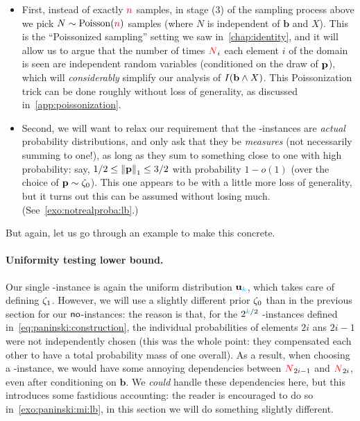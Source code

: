 \begin{itemize}
	\item First, instead of exactly ${\textcolor{purple}{n}}$ samples, in stage (3) of the sampling process above we pick $N\sim\poisson{\ns}$ samples (where $N$ is independent of $\mathbf{b}$ and $X$). This is the ``Poissonized sampling'' setting we saw in~\cref{chap:identity}, and it will allow us to argue that the number of times $\textcolor{red}{N}_{i}$ each element $i$ of the domain is seen are independent random variables (conditioned on the draw of $\mathbf{p}$), which will \emph{considerably} simplify our analysis of $\mutualinfo{\mathbf{b}}{X}$. This Poissonization trick can be done roughly without loss of generality, as discussed in~\cref{app:poissonization}.
	\item Second, we will want to relax our requirement that the \no-instances are \emph{actual} probability distributions, and only ask that they be \emph{measures} (not necessarily summing to one!), as long as they sum to something close to one with high probability: say, $1/2\leq \normone{\p} \leq 3/2$ with probability $1-o(1)$ (over the choice of $\mathbf{p}\sim\zeta_0$). This one appears to be with a little more loss of generality, but it turns out this can be assumed without losing much. (See~\cref{exo:notrealproba:lb}.) 
\end{itemize}
\noindent But again, let us go through an example to make this concrete.

\paragraph{Uniformity testing lower bound.} Our single \yes-instance is again the uniform distribution $\mathbf{u}_{\textcolor{cyan}{k}}$, which takes care of defining $\zeta_1$. However, we will use a slightly different prior $\zeta_0$ than in the previous section for our ${\sf{}no}$-instances: the reason is that, for the $2^{{\textcolor{cyan}{k}}/2}$ \no-instances defined in~\cref{eq:paninski:construction}, the individual probabilities of elements $2i$ ans $2i-1$ were not independently chosen (this was the whole point: they compensated each other to have a total probability mass of one overall). As a result, when choosing a \no-instance, we would have some annoying dependencies between $\textcolor{red}{N}_{2i-1}$ and $\textcolor{red}{N}_{2i}$, even after conditioning on $\textbf{b}$.  We \emph{could} handle these dependencies here, but this introduces some fastidious accounting: the reader is encouraged to do so in~\cref{exo:paninski:mi:lb}, in this section we will do something slightly different.

